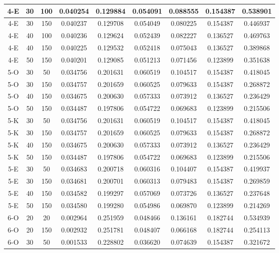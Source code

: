 \begin{center}
\begin{longtable}{|c|c|c|c|c|c|c|c|c|}
	\hline 4-E &	30 &	100	&	0.040254 &	0.129884 &	0.054091 &	0.088555 &	0.154387 &	0.538901 \\
	\hline 4-E &	30 &	150	&	0.040237 &	0.129708 &	0.054049 &	0.080225 &	0.154387 &	0.446937 \\
	\hline 4-E &	40 &	100	&	0.040236 &	0.129624 &	0.052439 &	0.082227 &	0.136527 &	0.469763 \\
	\hline 4-E &	40 &	150	&	0.040225 &	0.129532 &	0.052418 &	0.075043 &	0.136527 &	0.389868 \\
	\hline \rowcolor{acceptable} 4-E &	50 &	150	&	0.040201 &	0.129085 &	0.051213 &	0.071456 &	0.123899 &	0.351638 \\
	\hline 5-O &	30 &	50	&	0.034756 &	0.201631 &	0.060519 &	0.104517 &	0.154387 &	0.418045 \\
	\hline 5-O &	30 &	150	&	0.034757 &	0.201659 &	0.060525 &	0.079633 &	0.154387 &	0.268872 \\
	\hline 5-O &	40 &	150	&	0.034675 &	0.200630 &	0.057333 &	0.073912 &	0.136527 &	0.236429 \\
	\hline 5-O &	50 &	150	&	0.034487 &	0.197806 &	0.054722 &	0.069683 &	0.123899 &	0.215506 \\
	\hline 5-K &	30 &	50	&	0.034756 &	0.201631 &	0.060519 &	0.104517 &	0.154387 &	0.418045 \\
	\hline 5-K &	30 &	150	&	0.034757 &	0.201659 &	0.060525 &	0.079633 &	0.154387 &	0.268872 \\
	\hline 5-K &	40 &	150	&	0.034675 &	0.200630 &	0.057333 &	0.073912 &	0.136527 &	0.236429 \\
	\hline 5-K &	50 &	150	&	0.034487 &	0.197806 &	0.054722 &	0.069683 &	0.123899 &	0.215506 \\
	\hline 5-E &	30 &	50	&	0.034683 &	0.200718 &	0.060316 &	0.104407 &	0.154387 &	0.419937 \\
	\hline 5-E &	30 &	150	&	0.034681 &	0.200701 &	0.060313 &	0.079483 &	0.154387 &	0.269859 \\
	\hline 5-E &	40 &	150	&	0.034582 &	0.199297 &	0.057069 &	0.073726 &	0.136527 &	0.237648 \\
	\hline 5-E &	50 &	150	&	0.034580 &	0.199280 &	0.054986 &	0.069870 &	0.123899 &	0.214269 \\
	\hline 6-O &	20 &	20	&	0.002964 &	0.251959 &	0.048466 &	0.136161 &	0.182744 &	0.534939 \\
	\hline 6-O &	20 &	150	&	0.002932 &	0.251781 &	0.048407 &	0.066168 &	0.182744 &	0.254113 \\
	\hline 6-O &	30 &	50	&	0.001533 &	0.228802 &	0.036620 &	0.074639 &	0.154387 &	0.321672 \\

\end{longtable}
\end{center}
